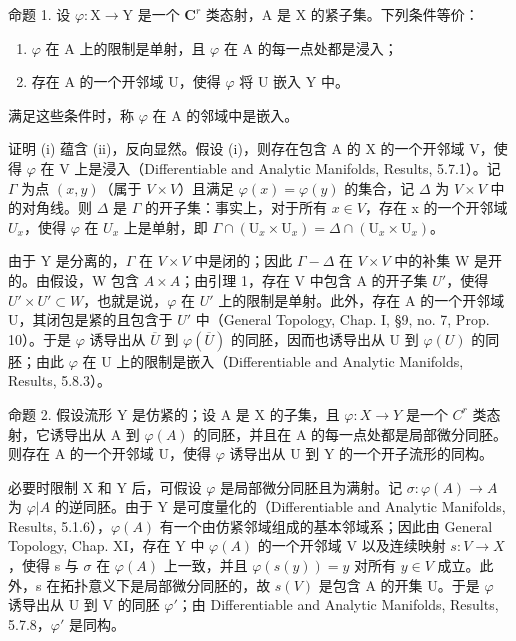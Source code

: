 命题 1. 设 \(\varphi : \mathrm{X} \to \mathrm{Y}\) 是一个 \(\mathbf{C}^r\) 类态射，A 是 \(\mathrm{X}\) 的紧子集。下列条件等价：

\begin{enumerate}
\def\labelenumi{(\roman{enumi})}
\item
  \(\varphi\) 在 A 上的限制是单射，且 \(\varphi\) 在 A 的每一点处都是浸入；
\item
  存在 A 的一个开邻域 U，使得 \(\varphi\) 将 U 嵌入 Y 中。
\end{enumerate}

满足这些条件时，称 \(\varphi\) 在 A 的邻域中是嵌入。

证明 (i) 蕴含 (ii)，反向显然。假设 (i)，则存在包含 A 的 X 的一个开邻域 V，使得 \(\varphi\) 在 V 上是浸入（Differentiable and Analytic Manifolds, Results, 5.7.1）。记 \(\Gamma\) 为点 \((x,y)\)（属于 \(V \times V\)）且满足 \(\varphi(x) = \varphi(y)\) 的集合，记 \(\Delta\) 为 \(V \times V\) 中的对角线。则 \(\Delta\) 是 \(\Gamma\) 的开子集：事实上，对于所有 \(x \in V\)，存在 x 的一个开邻域 \(U_x\)，使得 \(\varphi\) 在 \(U_x\) 上是单射，即 \(\Gamma \cap (\mathrm{U}_x \times \mathrm{U}_x) = \Delta \cap (\mathrm{U}_x \times \mathrm{U}_x)\)。

由于 Y 是分离的，\(\varGamma\) 在 \(V \times V\) 中是闭的；因此 \(\varGamma - \varDelta\) 在 \(V \times V\) 中的补集 W 是开的。由假设，W 包含 \(A \times A\)；由引理 1，存在 V 中包含 A 的开子集 \(U'\)，使得 \(U' \times U' \subset W\)，也就是说，\(\varphi\) 在 \(U'\) 上的限制是单射。此外，存在 A 的一个开邻域 U，其闭包是紧的且包含于 \(U'\) 中（General Topology, Chap. I, §9, no. 7, Prop. 10）。于是 \(\varphi\) 诱导出从 \(\overline{U}\) 到 \(\varphi(\overline{U})\) 的同胚，因而也诱导出从 U 到 \(\varphi(U)\) 的同胚；由此 \(\varphi\) 在 U 上的限制是嵌入（Differentiable and Analytic Manifolds, Results, 5.8.3）。

命题 2. 假设流形 Y 是仿紧的；设 A 是 X 的子集，且 \(\varphi : X \to Y\) 是一个 \(C^r\) 类态射，它诱导出从 A 到 \(\varphi(A)\) 的同胚，并且在 A 的每一点处都是局部微分同胚。则存在 A 的一个开邻域 U，使得 \(\varphi\) 诱导出从 U 到 Y 的一个开子流形的同构。

必要时限制 X 和 Y 后，可假设 \(\varphi\) 是局部微分同胚且为满射。记 \(\sigma : \varphi(A) \to A\) 为 \(\varphi|A\) 的逆同胚。由于 Y 是可度量化的（Differentiable and Analytic Manifolds, Results, 5.1.6），\(\varphi(A)\) 有一个由仿紧邻域组成的基本邻域系；因此由 General Topology, Chap. XI，存在 Y 中 \(\varphi(A)\) 的一个开邻域 V 以及连续映射 \(s : V \to X\)，使得 s 与 \(\sigma\) 在 \(\varphi(A)\) 上一致，并且 \(\varphi(s(y)) = y\) 对所有 \(y \in V\) 成立。此外，s 在拓扑意义下是局部微分同胚的，故 \(s(V)\) 是包含 A 的开集 U。于是 \(\varphi\) 诱导出从 U 到 V 的同胚 \(\varphi'\)；由 Differentiable and Analytic Manifolds, Results, 5.7.8，\(\varphi'\) 是同构。

